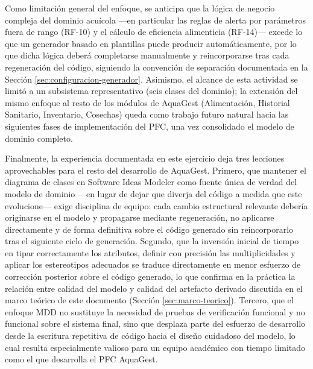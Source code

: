 \documentclass[11pt,a4paper]{article}
\begin{document}
Como limitación general del enfoque, se anticipa que la lógica de negocio compleja del dominio acuícola —en particular las reglas de alerta por parámetros fuera de rango (RF-10) y el cálculo de eficiencia alimenticia (RF-14)— excede lo que un generador basado en plantillas puede producir automáticamente, por lo que dicha lógica deberá completarse manualmente y reincorporarse tras cada regeneración del código, siguiendo la convención de separación documentada en la Sección \ref{sec:configuracion-generador}. Asimismo, el alcance de esta actividad se limitó a un subsistema representativo (seis clases del dominio); la extensión del mismo enfoque al resto de los módulos de AquaGest (Alimentación, Historial Sanitario, Inventario, Cosechas) queda como trabajo futuro natural hacia las siguientes fases de implementación del PFC, una vez consolidado el modelo de dominio completo.

Finalmente, la experiencia documentada en este ejercicio deja tres lecciones aprovechables para el resto del desarrollo de AquaGest. Primero, que mantener el diagrama de clases en Software Ideas Modeler como fuente única de verdad del modelo de dominio —en lugar de dejar que diverja del código a medida que este evolucione— exige disciplina de equipo: cada cambio estructural relevante debería originarse en el modelo y propagarse mediante regeneración, no aplicarse directamente y de forma definitiva sobre el código generado sin reincorporarlo tras el siguiente ciclo de generación. Segundo, que la inversión inicial de tiempo en tipar correctamente los atributos, definir con precisión las multiplicidades y aplicar los estereotipos adecuados se traduce directamente en menor esfuerzo de corrección posterior sobre el código generado, lo que confirma en la práctica la relación entre calidad del modelo y calidad del artefacto derivado discutida en el marco teórico de este documento (Sección \ref{sec:marco-teorico}). Tercero, que el enfoque MDD no sustituye la necesidad de pruebas de verificación funcional y no funcional sobre el sistema final, sino que desplaza parte del esfuerzo de desarrollo desde la escritura repetitiva de código hacia el diseño cuidadoso del modelo, lo cual resulta especialmente valioso para un equipo académico con tiempo limitado como el que desarrolla el PFC AquaGest.

\newpage



\newpage
\appendix
\end{document}

